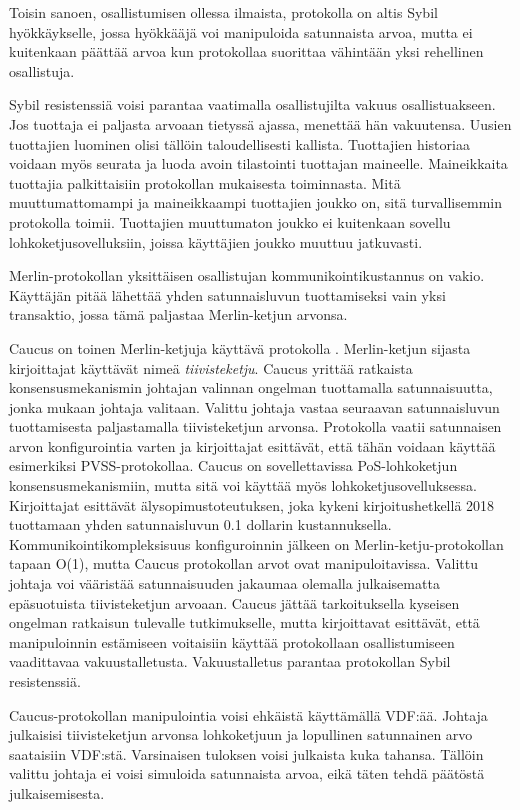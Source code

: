 Toisin sanoen, osallistumisen ollessa ilmaista, protokolla on altis Sybil hyökkäykselle, jossa hyökkääjä voi manipuloida satunnaista arvoa, mutta ei kuitenkaan päättää arvoa kun protokollaa suorittaa vähintään yksi rehellinen osallistuja.

Sybil resistenssiä voisi parantaa vaatimalla osallistujilta vakuus osallistuakseen. Jos tuottaja ei paljasta arvoaan tietyssä ajassa, menettää hän vakuutensa. Uusien tuottajien luominen olisi tällöin taloudellisesti kallista. Tuottajien historiaa voidaan myös seurata ja luoda avoin tilastointi tuottajan maineelle. Maineikkaita tuottajia palkittaisiin protokollan mukaisesta toiminnasta. Mitä muuttumattomampi ja maineikkaampi tuottajien joukko on, sitä turvallisemmin protokolla toimii. Tuottajien muuttumaton joukko ei kuitenkaan sovellu lohkoketjusovelluksiin, joissa käyttäjien joukko muuttuu jatkuvasti. 

Merlin-protokollan yksittäisen osallistujan kommunikointikustannus on vakio. Käyttäjän pitää lähettää yhden satunnaisluvun tuottamiseksi vain yksi transaktio, jossa tämä paljastaa Merlin-ketjun arvonsa. 

Caucus on toinen Merlin-ketjuja käyttävä protokolla \cite{Caucus}. Merlin-ketjun sijasta kirjoittajat käyttävät nimeä \textit{tiivisteketju}. Caucus yrittää ratkaista konsensusmekanismin johtajan valinnan ongelman tuottamalla satunnaisuutta, jonka mukaan johtaja valitaan. Valittu johtaja vastaa seuraavan satunnaisluvun tuottamisesta paljastamalla tiivisteketjun arvonsa. Protokolla vaatii satunnaisen arvon konfigurointia varten ja kirjoittajat esittävät, että tähän voidaan käyttää esimerkiksi PVSS-protokollaa. Caucus on sovellettavissa PoS-lohkoketjun konsensusmekanismiin, mutta sitä voi käyttää myös lohkoketjusovelluksessa. Kirjoittajat esittävät älysopimustoteutuksen, joka kykeni kirjoitushetkellä 2018 tuottamaan yhden satunnaisluvun 0.1 dollarin kustannuksella. Kommunikointikompleksisuus konfiguroinnin jälkeen on Merlin-ketju-protokollan tapaan O(1), mutta Caucus protokollan arvot ovat manipuloitavissa. Valittu johtaja voi vääristää satunnaisuuden jakaumaa olemalla julkaisematta epäsuotuista tiivisteketjun arvoaan. Caucus jättää tarkoituksella kyseisen ongelman ratkaisun tulevalle tutkimukselle, mutta kirjoittavat esittävät, että manipuloinnin estämiseen voitaisiin käyttää protokollaan osallistumiseen vaadittavaa vakuustalletusta. Vakuustalletus parantaa protokollan Sybil resistenssiä.

Caucus-protokollan manipulointia voisi ehkäistä käyttämällä VDF:ää. Johtaja julkaisisi tiivisteketjun arvonsa lohkoketjuun ja lopullinen satunnainen arvo saataisiin VDF:stä. Varsinaisen tuloksen voisi julkaista kuka tahansa. Tällöin valittu johtaja ei voisi simuloida satunnaista arvoa, eikä täten tehdä päätöstä julkaisemisesta.

